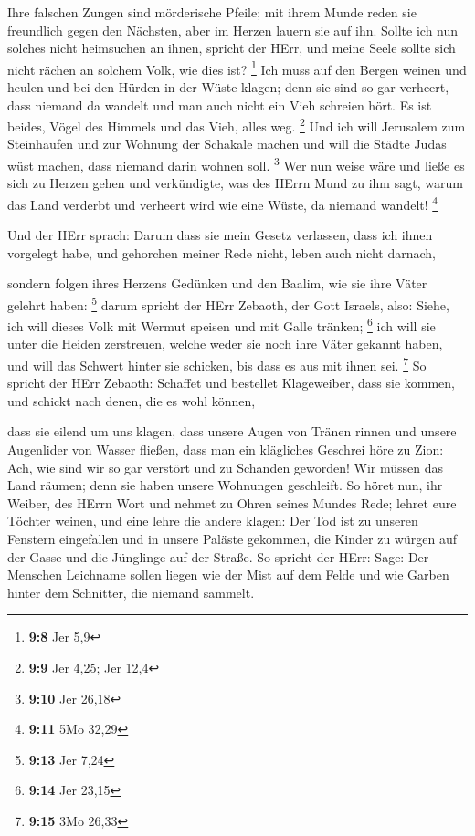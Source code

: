  Ihre falschen Zungen sind mörderische Pfeile; mit ihrem
Munde reden sie freundlich gegen den Nächsten, aber im Herzen lauern sie
auf ihn.  Sollte ich nun solches nicht heimsuchen an ihnen,
spricht der HErr, und meine Seele sollte sich nicht rächen an solchem
Volk, wie dies ist? \footnote{\textbf{9:8} Jer 5,9}  Ich
muss auf den Bergen weinen und heulen und bei den Hürden in der Wüste
klagen; denn sie sind so gar verheert, dass niemand da wandelt und man
auch nicht ein Vieh schreien hört. Es ist beides, Vögel des Himmels und
das Vieh, alles weg. \footnote{\textbf{9:9} Jer 4,25; Jer 12,4}
 Und ich will Jerusalem zum Steinhaufen und zur Wohnung der
Schakale machen und will die Städte Judas wüst machen, dass niemand
darin wohnen soll. \footnote{\textbf{9:10} Jer 26,18}  Wer
nun weise wäre und ließe es sich zu Herzen gehen und verkündigte, was
des HErrn Mund zu ihm sagt, warum das Land verderbt und verheert wird
wie eine Wüste, da niemand wandelt! \footnote{\textbf{9:11} 5Mo 32,29}

 Und der HErr sprach: Darum dass sie mein Gesetz verlassen,
dass ich ihnen vorgelegt habe, und gehorchen meiner Rede nicht, leben
auch nicht darnach,

 sondern folgen ihres Herzens Gedünken und den Baalim, wie
sie ihre Väter gelehrt haben: \footnote{\textbf{9:13} Jer 7,24}
 darum spricht der HErr Zebaoth, der Gott Israels, also:
Siehe, ich will dieses Volk mit Wermut speisen und mit Galle tränken;
\footnote{\textbf{9:14} Jer 23,15}  ich will sie unter die
Heiden zerstreuen, welche weder sie noch ihre Väter gekannt haben, und
will das Schwert hinter sie schicken, bis dass es aus mit ihnen sei.
\footnote{\textbf{9:15} 3Mo 26,33}  So spricht der HErr
Zebaoth: Schaffet und bestellet Klageweiber, dass sie kommen, und
schickt nach denen, die es wohl können,

 dass sie eilend um uns klagen, dass unsere Augen von
Tränen rinnen und unsere Augenlider von Wasser fließen, 
dass man ein klägliches Geschrei höre zu Zion: Ach, wie sind wir so gar
verstört und zu Schanden geworden! Wir müssen das Land räumen; denn sie
haben unsere Wohnungen geschleift.  So höret nun, ihr
Weiber, des HErrn Wort und nehmet zu Ohren seines Mundes Rede; lehret
eure Töchter weinen, und eine lehre die andere klagen:  Der
Tod ist zu unseren Fenstern eingefallen und in unsere Paläste gekommen,
die Kinder zu würgen auf der Gasse und die Jünglinge auf der Straße.
 So spricht der HErr: Sage: Der Menschen Leichname sollen
liegen wie der Mist auf dem Felde und wie Garben hinter dem Schnitter,
die niemand sammelt.

